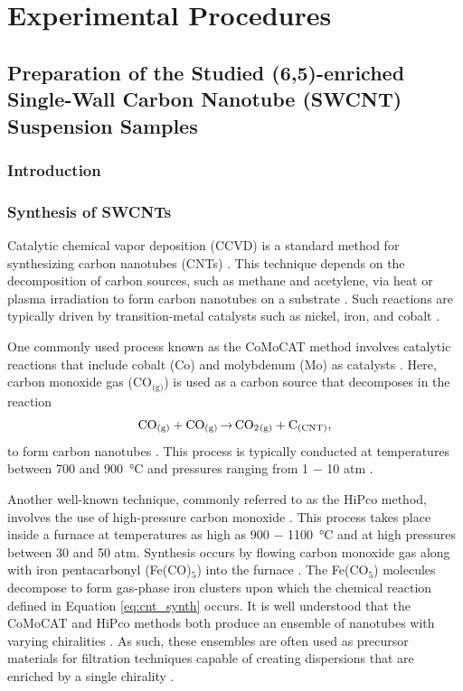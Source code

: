 \chapter{Experimental Procedures}

\section{Preparation of the Studied (6,5)-enriched Single-Wall Carbon Nanotube (SWCNT) Suspension Samples }

\subsection{Introduction}

\subsection{Synthesis of SWCNTs}
\label{section:cnt_synthesis}
Catalytic chemical vapor deposition (CCVD) is a standard method for synthesizing carbon nanotubes (CNTs) \cite{prasek2011methods, agboola2007conceptual}. This technique depends on the decomposition of carbon sources, such as methane and acetylene, via heat or plasma irradiation to form carbon nanotubes on a substrate \cite{agboola2007conceptual}. Such reactions are typically driven by transition-metal catalysts such as nickel, iron, and cobalt \cite{prasek2011methods}.

One commonly used process known as the CoMoCAT method involves catalytic reactions that include cobalt (Co) and molybdenum (Mo) as catalysts \cite{resasco2002scalable}. Here, carbon monoxide gas (CO$_\text{(g)}$) is used as a carbon source that decomposes in the reaction
\vspace{-2mm}
\begin{equation}
\label{eq:cnt_synth}
\ce{CO_{(g)} + CO_{(g)} $\rightarrow$ CO_2_{\text{(g)}} + C_{(CNT)}},
\end{equation}
to form carbon nanotubes \cite{resasco2002scalable}. This process is typically conducted at temperatures between 700 and \SI{900}{\celsius} and pressures ranging from 1 $-$ 10 atm \cite{resasco2002scalable}.

Another well-known technique, commonly referred to as the HiPco method, involves the use of high-pressure carbon monoxide \cite{bronikowski2001gas, nikolaev1999gas}. This process takes place inside a furnace at temperatures as high as 900 $-$ \SI{1100}{\celsius} and at high pressures between 30 and 50 atm. Synthesis occurs by flowing carbon monoxide gas along with iron pentacarbonyl (Fe(CO)$_5$) into the furnace \cite{nikolaev1999gas}. The Fe(CO$_5$) molecules decompose to form gas-phase iron clusters upon which the chemical reaction defined in Equation \eqref{eq:cnt_synth} occurs. It is well understood that the CoMoCAT and HiPco methods both produce an ensemble of nanotubes with varying chiralities \cite{agboola2007conceptual}. As such, these ensembles are often used as precursor materials for filtration techniques capable of creating dispersions that are enriched by a single chirality \cite{janas2018towards, zheng2019sorting}.

